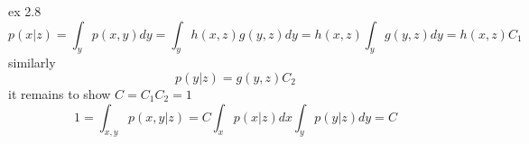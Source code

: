 \documentclass[12pt]{article}
\begin{document}
ex 2.8
\begin{equation}
p(x|z) = \int_{y} p(x,y)dy = \int_{y}h(x,z)g(y,z)dy = h(x,z)\int_{y}g(y,z)dy = h(x,z)C_1
\end{equation}
similarly
\begin{equation}
p(y|z) = g(y,z)C_2
\end{equation}
it remains to show $C = C_1C_2 = 1$
\begin{equation}
1 = \int_{x,y}p(x,y|z) = C\int_{x}p(x|z)dx\int_{y}p(y|z)dy = C 
\end{equation}
\end{document}
